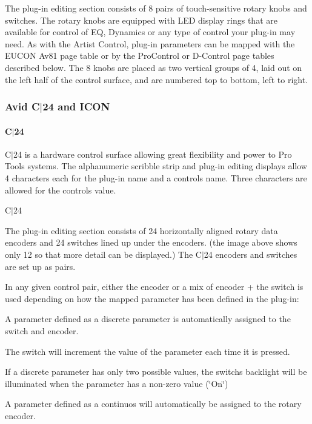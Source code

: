 The plug-\/in editing section consists of 8 pairs of touch-\/sensitive rotary knobs and switches. The rotary knobs are equipped with L\+E\+D display rings that are available for control of E\+Q, Dynamics or any type of control your plug-\/in may need. As with the Artist Control, plug-\/in parameters can be mapped with the E\+U\+C\+O\+N {\ttfamily Av81} page table or by the Pro\+Control or D-\/\+Control page tables described below. The 8 knobs are placed as two vertical groups of 4, laid out on the left half of the control surface, and are numbered top to bottom, left to right. \hypertarget{a00363_subsection__avid_c24_and_icon}{}\subsubsection{Avid C$\vert$24 and I\+C\+O\+N}\label{a00363_subsection__avid_c24_and_icon}
 \hypertarget{a00363_subsubsection__c24_}{}\paragraph{C$\vert$24}\label{a00363_subsubsection__c24_}
 C$\vert$24 is a hardware control surface allowing great flexibility and power to Pro Tools systems. The alphanumeric scribble strip and plug-\/in editing displays allow 4 characters each for the plug-\/in name and a control\textquotesingle{}s name. Three characters are allowed for the control\textquotesingle{}s value.

  C$\vert$24 

The plug-\/in editing section consists of 24 horizontally aligned rotary data encoders and 24 switches lined up under the encoders. (the image above shows only 12 so that more detail can be displayed.) The C$\vert$24 encoders and switches are set up as pairs.

In any given control pair, either the encoder or a mix of encoder + the switch is used depending on how the mapped parameter has been defined in the plug-\/in\+:


\begin{DoxyItemize}
\item A parameter defined as a discrete parameter is automatically assigned to the switch and encoder. 
\begin{DoxyItemize}
\item The switch will increment the value of the parameter each time it is pressed.  
\item If a discrete parameter has only two possible values, the switch\textquotesingle{}s backlight will be illuminated when the parameter has a non-\/zero value (\char`\"{}\+On\char`\"{})  
\end{DoxyItemize}
\item A parameter defined as a continuos will automatically be assigned to the rotary encoder.  
\end{DoxyItemize}

